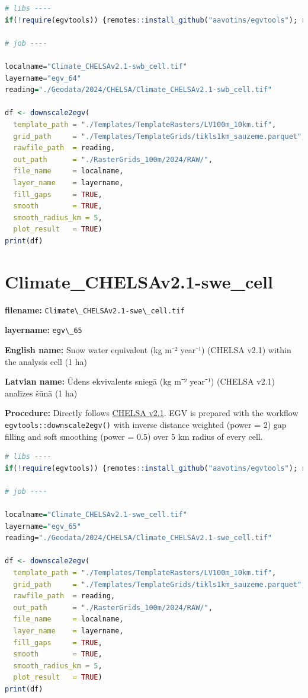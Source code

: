 \documentclass[
]{book}
\newcommand{\passthrough}[1]{#1}
\begin{document}
\begin{lstlisting}[language=R]
# libs ----
if(!require(egvtools)) {remotes::install_github("aavotins/egvtools"); require(egvtools)}

# job ----

localname="Climate_CHELSAv2.1-swb_cell.tif"
layername="egv_64"
reading="./Geodata/2024/CHELSA/Climate_CHELSAv2.1-swb_cell.tif"

df <- downscale2egv(
  template_path = "./Templates/TemplateRasters/LV100m_10km.tif",
  grid_path     = "./Templates/TemplateGrids/tikls1km_sauzeme.parquet",
  rawfile_path  = reading,
  out_path      = "./RasterGrids_100m/2024/RAW/",
  file_name     = localname,
  layer_name    = layername,
  fill_gaps     = TRUE,
  smooth        = TRUE,
  smooth_radius_km = 5,
  plot_result   = TRUE)
print(df)
\end{lstlisting}

\section{Climate\_CHELSAv2.1-swe\_cell}\label{ch06.065}

\textbf{filename:} \passthrough{\lstinline!Climate\_CHELSAv2.1-swe\_cell.tif!}

\textbf{layername:} \passthrough{\lstinline!egv\_65!}

\textbf{English name:} Snow water equivalent (kg m⁻² year⁻¹) (CHELSA v2.1) within the analysis cell (1 ha)

\textbf{Latvian name:} Ūdens ekvivalents sniegā (kg m⁻² year⁻¹) (CHELSA v2.1) analīzes šūnā (1 ha)

\textbf{Procedure:} Directly follows \hyperref[Ch04.11]{CHELSA v2.1}. EGV is prepared with the
workflow \passthrough{\lstinline!egvtools::downscale2egv()!} with inverse distance weighted (power = 2)
gap filling and soft smoothing (power = 0.5) over 5 km radius of every cell.

\begin{lstlisting}[language=R]
# libs ----
if(!require(egvtools)) {remotes::install_github("aavotins/egvtools"); require(egvtools)}

# job ----

localname="Climate_CHELSAv2.1-swe_cell.tif"
layername="egv_65"
reading="./Geodata/2024/CHELSA/Climate_CHELSAv2.1-swe_cell.tif"

df <- downscale2egv(
  template_path = "./Templates/TemplateRasters/LV100m_10km.tif",
  grid_path     = "./Templates/TemplateGrids/tikls1km_sauzeme.parquet",
  rawfile_path  = reading,
  out_path      = "./RasterGrids_100m/2024/RAW/",
  file_name     = localname,
  layer_name    = layername,
  fill_gaps     = TRUE,
  smooth        = TRUE,
  smooth_radius_km = 5,
  plot_result   = TRUE)
print(df)
\end{lstlisting}
\end{document}
